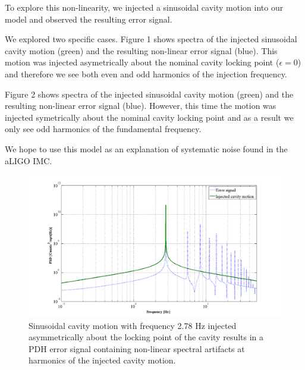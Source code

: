 To explore this non-linearity, we injected a sinusoidal cavity motion into our model and observed the resulting error signal.

We explored two specific cases. Figure 1 shows spectra of the injected sinusoidal cavity motion (green) and the resulting non-linear error signal (blue). This motion was injected asymetrically about the nominal cavity locking point ($\epsilon = 0$) and therefore we see both even and odd harmonics of the injection frequency.

Figure 2 shows spectra of the injected sinusoidal cavity motion (green) and the resulting non-linear error signal (blue). However, this time the motion was injected symetrically about the nominal cavity locking point and as a result we only see odd harmonics of the fundamental frequency.

We hope to use this model as an explanation of systematic noise found in the aLIGO IMC.

\begin{figure}[h!]
\includegraphics[height=0.6\textwidth]{figures/IMCUpconversion/PDH_error_signal_harmonics.png}
\caption[PDH response to asymmetric cavity motion]{Sinusoidal cavity motion with frequency 2.78 Hz injected asymmetrically about the locking point of the cavity results in a PDH error signal containing non-linear spectral artifacts at harmonics of the injected cavity motion.}
\end{figure}

